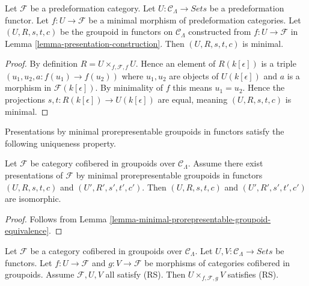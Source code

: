 \begin{lemma}
\label{lemma-minimal-groupoid-in-functors-construction}
Let $\mathcal{F}$ be a predeformation category.  Let $U: \mathcal{C}_\Lambda 
\to \textit{Sets}$ be a predeformation functor.  Let $f: U 
\to \mathcal{F}$ be a minimal morphism of predeformation categories. Let 
$(U,R,s,t,c)$ be the groupoid in functors on $\mathcal{C}_\Lambda$ constructed 
from $f: U \to \mathcal{F}$ in Lemma 
\ref{lemma-presentation-construction}.  Then $(U,R,s,t,c)$ is minimal. 
\end{lemma}

\begin{proof}
By definition $R = U \times_{f,\mathcal{F}, f} U$.  Hence an element of 
$R(k[\epsilon])$ is a triple $(u_1, u_2, a: f(u_1) \to f(u_2))$ 
where $u_1,u_2$ are objects of $U(k[\epsilon])$ and $a$ is a morphism in 
$\mathcal{F}(k[\epsilon])$.  By minimality of $f$ this means $u_1 = u_2$.  
Hence the projections $s,t: R(k[\epsilon]) \to U(k[\epsilon])$ 
are equal, meaning  $(U,R,s,t,c)$ is minimal.
\end{proof}

\noindent
Presentations by minimal prorepresentable groupoids in functors satisfy the 
following uniqueness property.

\begin{lemma}
\label{lemma-minimal-presentations-equivalent}
Let $\mathcal{F}$ be category cofibered in groupoids over $\mathcal 
C_\Lambda$. Assume there exist presentations of $\mathcal{F}$ by minimal 
prorepresentable groupoids in functors $(U,R,s,t,c)$ and $(U',R',s',t',c')$. 
Then $(U,R,s,t,c)$ and $(U',R',s',t',c')$ are isomorphic.
\end{lemma}

\begin{proof}
Follows from Lemma \ref{lemma-minimal-prorepresentable-groupoid-equivalence}.
\end{proof}

\begin{lemma}
\label{lemma-RS-fiber-product-morphisms}
Let $\mathcal{F}$ be a category cofibered in groupoids over $\mathcal 
C_\Lambda$.  Let $U,V: \mathcal{C}_\Lambda \to \textit{Sets}$ 
be functors.  Let $f: U \to \mathcal{F}$ and $g: V \to \mathcal 
F$ be morphisms of categories cofibered in groupoids.  Assume $\mathcal{F}, U, 
V$ all satisfy (RS).  Then $U \times_{f, \mathcal{F}, g} V$ satisfies (RS).
\end{lemma}

